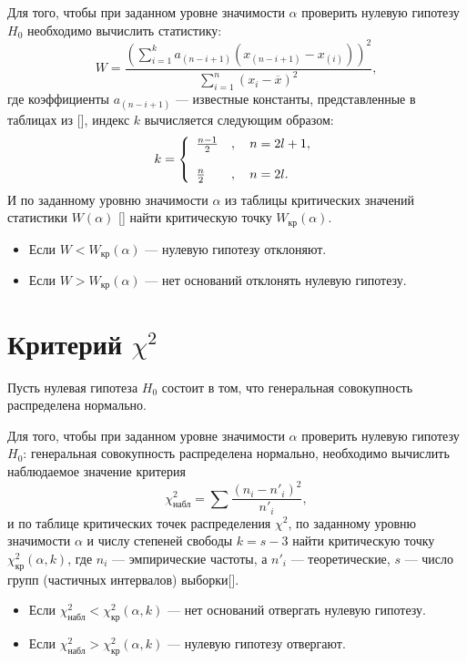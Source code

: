Для того, чтобы при заданном уровне значимости $\alpha$ проверить нулевую гипотезу $H_0$ необходимо вычислить статистику:
\begin{equation*}
	W = \frac{(\sum_{i=1}^{k}{a_{(n-i+1)} (x_{(n-i+1)} - x_{(i)})})^2}{\sum_{i=1}^{n}{(x_i - \overline{x})^2}},
\end{equation*}
где коэффициенты $a_{(n-i+1)}$ --- известные константы, представленные в таблицах из [], индекс $k$ вычисляется следующим образом:
\begin{equation*}
k = \left\{
 \begin{array}{l l}
   \frac{n-1}{2} &, \quad n = 2l + 1, \\
   \\
   \frac{n}{2} &, \quad n = 2l.
 \end{array} \right.
\end{equation*} 
И по заданному уровню значимости $\alpha$ из таблицы критических значений статистики $W(\alpha)$ [] найти критическую точку $W_{\textrm{кр}}(\alpha)$.
\begin{itemize}
	\item Если $W < W_{\textrm{кр}}(\alpha)$ --- нулевую гипотезу отклоняют.
	\item Если $W > W_{\textrm{кр}}(\alpha)$ --- нет оснований отклонять нулевую гипотезу.\end{itemize}

\section*{Критерий $\chi^2$} %
\label{sec:chisq}
Пусть нулевая гипотеза $H_0$ состоит в том, что генеральная совокупность распределена нормально.

Для того, чтобы при заданном уровне значимости $\alpha$ проверить нулевую гипотезу $H_0$: генеральная совокупность распределена нормально, необходимо вычислить наблюдаемое значение критерия
\begin{equation*}
	\chi_{\textrm{набл}}^2 = \sum{\frac{(n_i-n'_i)^2}{n'_i}},
\end{equation*}
и по таблице критических точек распределения $\chi^2$, по заданному уровню значимости $\alpha$ и числу степеней свободы $k = s-3$ найти критическую точку $\chi_{\textrm{кр}}^2(\alpha, k)$, где $n_i$ --- эмпирические частоты, а $n'_i$ --- теоретические, $s$ --- число групп (частичных интервалов) выборки[].
\begin{itemize}
	\item Если $\chi_{\textrm{набл}}^2 < \chi_{\textrm{кр}}^2(\alpha, k)$ --- нет оснований отвергать нулевую гипотезу.
	\item Если $\chi_{\textrm{набл}}^2 > \chi_{\textrm{кр}}^2(\alpha, k)$ --- нулевую гипотезу отвергают.
\end{itemize}

